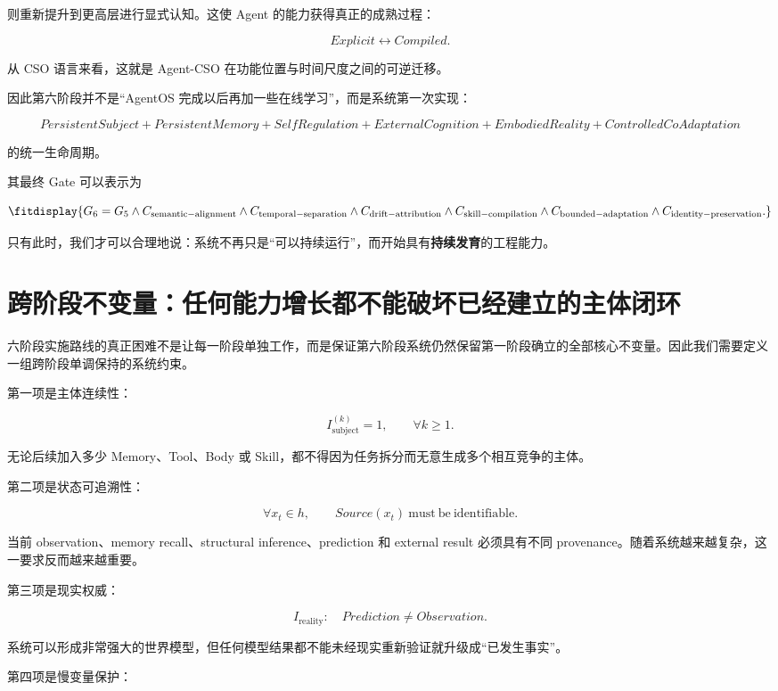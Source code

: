 则重新提升到更高层进行显式认知。这使 Agent 的能力获得真正的成熟过程：

\[
Explicit
\leftrightarrow
Compiled.
\]

从 CSO 语言来看，这就是 Agent-CSO 在功能位置与时间尺度之间的可逆迁移。

因此第六阶段并不是“AgentOS 完成以后再加一些在线学习”，而是系统第一次实现：

\[
\boxed{
PersistentSubject
+
PersistentMemory
+
SelfRegulation
+
ExternalCognition
+
EmbodiedReality
+
ControlledCoAdaptation
}
\]

的统一生命周期。

其最终 Gate 可以表示为

\[
\fitdisplay{
G_6
=
G_5
\land
C_{\mathrm{semantic-alignment}}
\land
C_{\mathrm{temporal-separation}}
\land
C_{\mathrm{drift-attribution}}
\land
C_{\mathrm{skill-compilation}}
\land
C_{\mathrm{bounded-adaptation}}
\land
C_{\mathrm{identity-preservation}}.
}
\]

只有此时，我们才可以合理地说：系统不再只是“可以持续运行”，而开始具有\textbf{持续发育}的工程能力。

\section{跨阶段不变量：任何能力增长都不能破坏已经建立的主体闭环}

六阶段实施路线的真正困难不是让每一阶段单独工作，而是保证第六阶段系统仍然保留第一阶段确立的全部核心不变量。因此我们需要定义一组跨阶段单调保持的系统约束。

第一项是主体连续性：

\[
I_{\mathrm{subject}}^{(k)}=1,
\qquad
\forall k\geq1.
\]

无论后续加入多少 Memory、Tool、Body 或 Skill，都不得因为任务拆分而无意生成多个相互竞争的主体。

第二项是状态可追溯性：

\[
\forall x_t\in h,
\qquad
Source(x_t)
\ \mathrm{must\ be\ identifiable}.
\]

当前 observation、memory recall、structural inference、prediction 和 external result 必须具有不同 provenance。随着系统越来越复杂，这一要求反而越来越重要。

第三项是现实权威：

\[
I_{\mathrm{reality}}:
\quad
Prediction
\neq
Observation.
\]

系统可以形成非常强大的世界模型，但任何模型结果都不能未经现实重新验证就升级成“已发生事实”。

第四项是慢变量保护：

